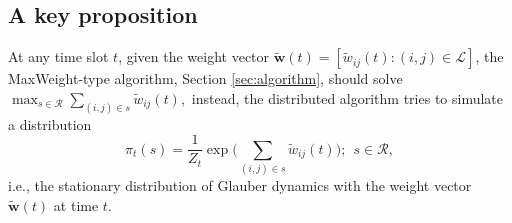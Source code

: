 \documentclass[10pt,onecolumn,draftclsnofoot,journal]{IEEEtran}
\begin{document}
\subsection*{A key proposition}
At any time slot $t$, given the weight vector $\mathbf{\tilde{w}}(t)=[\tilde{w}_{ij}(t): (i,j) \in \mathcal{L}]$, the MaxWeight-type algorithm, Section \ref{sec:algorithm}, should solve $
\max_{s \in \mathcal{R}} \sum_{(i,j) \in s}\tilde{w}_{ij}(t),
$
instead, the distributed algorithm tries to simulate a distribution
\begin{equation}\label{stationary}
\pi_t(s)=\frac{1}{Z_t} \exp\Big(\sum_{(i,j) \in s} \tilde{w}_{ij}(t)\Big);\ \ s \in \mathcal{R},
\end{equation}
i.e., the stationary distribution of Glauber dynamics with the weight vector $\mathbf{\tilde{w}}(t)$ at time $t$.
\end{document}
